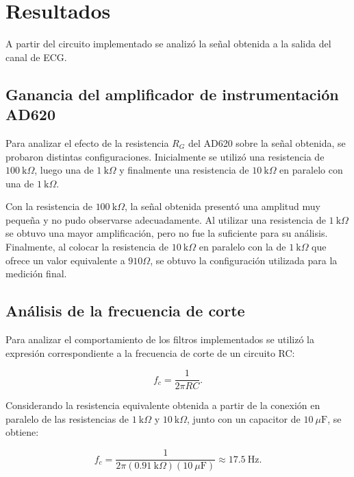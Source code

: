 \section{Resultados}

A partir del circuito implementado se analizó la señal obtenida a la salida del canal de ECG.

\subsection{Ganancia del amplificador de instrumentación AD620}

Para analizar el efecto de la resistencia $R_G$ del AD620 sobre la señal obtenida, se probaron distintas configuraciones. Inicialmente se utilizó una resistencia de $100~\mathrm{k}\Omega$, luego una de $1~\mathrm{k}\Omega$ y finalmente una resistencia de $10~\mathrm{k}\Omega$ en paralelo con una de $1~\mathrm{k}\Omega$.

Con la resistencia de $100~\mathrm{k}\Omega$, la señal obtenida presentó una amplitud muy pequeña y no pudo observarse adecuadamente. Al utilizar una resistencia de $1~\mathrm{k}\Omega$ se obtuvo una mayor amplificación,  pero no fue la suficiente para su análisis. Finalmente, al colocar la resistencia de $10~\mathrm{k}\Omega$ en paralelo con la de $1~\mathrm{k}\Omega$ que ofrece un valor equivalente a $910\Omega$, se obtuvo la configuración utilizada para la medición final.



\subsection{Análisis de la frecuencia de corte}

Para analizar el comportamiento de los filtros implementados se utilizó la expresión correspondiente a la frecuencia de corte de un circuito RC:

\begin{equation}
f_c = \frac{1}{2\pi RC}.
\end{equation}

Considerando la resistencia equivalente obtenida a partir de la conexión en paralelo de las resistencias de $1~\mathrm{k}\Omega$ y $10~\mathrm{k}\Omega$, junto con un capacitor de $10~\mu\mathrm{F}$, se obtiene:

\begin{equation}
f_c =
\frac{1}{2\pi(0.91~\mathrm{k}\Omega)(10~\mu\mathrm{F})}
\approx 17.5~\mathrm{Hz}.
\end{equation}

